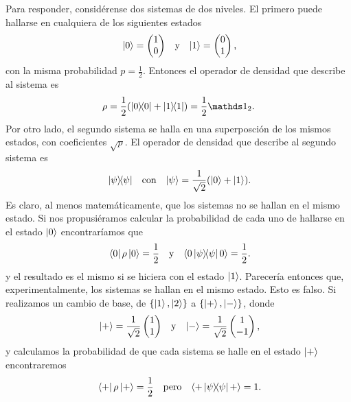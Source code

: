 Para responder, considérense dos sistemas de dos niveles. El primero puede hallarse en cualquiera de los siguientes estados
\begin{align*}
    \ket{0}=\begin{pmatrix}
        1\\
        0
    \end{pmatrix} && \text{y} && \ket{1}=\begin{pmatrix}
        0\\
        1
    \end{pmatrix}\rlap{,}
\end{align*}
con la misma probabilidad $p=\frac{1}{2}$. Entonces el operador de densidad que describe al sistema es 
\begin{equation*}
    \rho=\frac{1}{2}(\dyad{0}+\dyad{1})=\frac{1}{2}\Id_{2}.
\end{equation*}
Por otro lado, el segundo sistema se halla en una superposción de los mismos estados, con coeficientes $\sqrt{p}$. El operador de densidad que describe al segundo sistema es 
\begin{align*}
    \dyad{\psi} && \text{con} && \ket{\psi}=\frac{1}{\sqrt{2}}(\ket{0}+\ket{1})\rlap{.}
\end{align*}
Es claro, al menos matemáticamente, que los sistemas no se hallan en el mismo estado. Si nos propusiéramos calcular la probabilidad de cada uno de hallarse en el estado $\ket{0}$ encontraríamos que
\begin{align*}
    \bra{0}\rho\ket{0}=\frac{1}{2} && \text{y} &&\langle 0 \dyad{\psi} 0\rangle=\frac{1}{2}\rlap{.}
\end{align*}
y el resultado es el mismo si se hiciera con el estado $\ket{1}$. Parecería entonces que, experimentalmente, los sistemas se hallan en el mismo estado. Esto es falso. Si realizamos un cambio de base, de $\{\ket{1},\ket{2}\}$ a $\{\ket{+},\ket{-}\}$, donde
\begin{align*}
    \ket{+}=\frac{1}{\sqrt{2}}\begin{pmatrix}
        1\\
        1
    \end{pmatrix} && \text{y} && \ket{-}=\frac{1}{\sqrt{2}}\begin{pmatrix}
        1\\
        -1
    \end{pmatrix}\rlap{,}
\end{align*}
y calculamos la probabilidad de que cada sistema se halle en el estado $\ket{+}$ encontraremos
\begin{align*}
    \bra{+}\rho\ket{+}=\frac{1}{2} && \text{pero} &&\langle + \dyad{\psi} +\rangle=1\rlap{.}
\end{align*}
